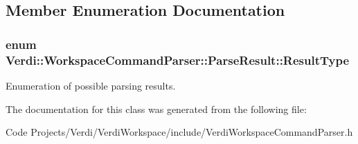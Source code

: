 \subsection{\-Member \-Enumeration \-Documentation}
\hypertarget{class_verdi_1_1_workspace_command_parser_1_1_parse_result_a66a689e736943fdd8d7390535d4b2554}{
\subsubsection[{\-Result\-Type}]{\setlength{\rightskip}{0pt plus 5cm}enum {\bf \-Verdi\-::\-Workspace\-Command\-Parser\-::\-Parse\-Result\-::\-Result\-Type}}}\label{class_verdi_1_1_workspace_command_parser_1_1_parse_result_a66a689e736943fdd8d7390535d4b2554}
\-Enumeration of possible parsing results. 

\-The documentation for this class was generated from the following file\-:\begin{DoxyCompactItemize}
\item 
\-Code Projects/\-Verdi/\-Verdi\-Workspace/include/\-Verdi\-Workspace\-Command\-Parser.\-h\end{DoxyCompactItemize}
